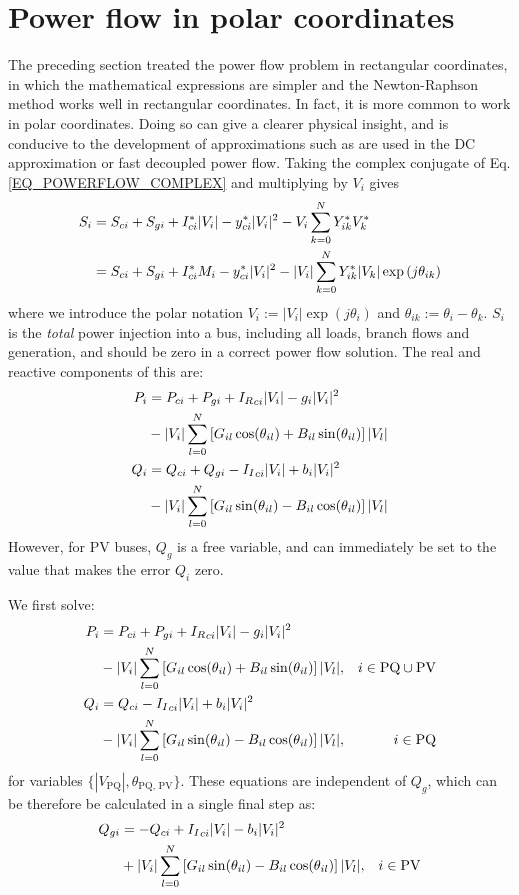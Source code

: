 \documentclass[11pt]{article}
\newcommand{\Ir}{{I_R}}
\newcommand{\Ii}{{I_I}}
\begin{document}
\section{Power flow in polar coordinates}
The preceding section treated the power flow problem in rectangular coordinates, in which the mathematical expressions are simpler and the Newton-Raphson method works well in rectangular coordinates. In fact, it is more common to work in polar coordinates. Doing so can give a clearer physical insight, and is conducive to the development of approximations such as are used in the DC approximation or fast decoupled power flow. Taking the complex conjugate of Eq. \ref{EQ_POWERFLOW_COMPLEX} and multiplying by $V_i$ gives
\newcommand{\M}[1]{\ensuremath{|V_{#1}|}}
\newcommand{\cs}[1]{\ensuremath{\cos(\theta_{#1})}}
\newcommand{\sn}[1]{\ensuremath{\sin(\theta_{#1})}}
\begin{align}
	S_i &= S_{ci} + S_{gi} + I^*_{ci}\M{i} - y^*_{ci}\M{i}^2 - V_i\sum_{k = 0}^N{Y^*_{ik}V^*_k} \notag \\
	&= S_{ci} + S_{gi} + I^*_{ci}M_i - y^*_{ci}\M{i}^2 - \M{i}\sum_{k = 0}^N{Y^*_{ik}\M{k}\exp{(j\theta_{ik})}}
\end{align}
where we introduce the polar notation $V_i := \M{i} \exp{(j\theta_i)}$ and $\theta_{ik} := \theta_i - \theta_k$. $S_i$ is the \emph{total} power injection into a bus, including all loads, branch flows and generation, and should be zero in a correct power flow solution. The real and reactive components of this are:
\begin{align}
	P_i &= P_{ci} + P_{gi} + \Ir_{ci}\M{i} - g_i\M{i}^2 \notag \\
	&- \M{i}\sum_{l = 0}^N{\left[G_{il}\cs{il} + B_{il}\sn{il}\right]\M{l}} \notag \\
	Q_i &= Q_{ci} + Q_{gi} - \Ii_{ci}\M{i} + b_i\M{i}^2 \notag \\
	&- \M{i}\sum_{l = 0}^N{\left[G_{il}\sn{il} - B_{il}\cs{il}\right]\M{l}} \notag \\
\end{align}
However, for PV buses, $Q_{g}$ is a free variable, and can immediately be set to the value that makes the error $Q_i$ zero.

We first solve:
\begin{align}
	P_i &= P_{ci} + P_{gi} + \Ir_{ci}\M{i} - g_i\M{i}^2 \notag \\
	&- \M{i}\sum_{l = 0}^N{\left[G_{il}\cs{il} + B_{il}\sn{il}\right]\M{l}}  , & i \in \mathrm{PQ} \cup \mathrm{PV}\notag \\
	Q_i &= Q_{ci} - \Ii_{ci}\M{i} + b_i\M{i}^2 \notag \\
	&- \M{i}\sum_{l = 0}^N{\left[G_{il}\sn{il} - B_{il}\cs{il}\right]\M{l}}, & i \in \mathrm{PQ}
\end{align}
for variables $\{\M{\text{PQ}}, \theta_\text{PQ, PV}\}$. These equations are independent of $Q_g$, which can be therefore be calculated in a single final step as:
\begin{align}
	Q_{gi} &= -Q_{ci} + \Ii_{ci}\M{i} - b_i\M{i}^2 \notag \\
	&+ \M{i}\sum_{l = 0}^N{\left[G_{il}\sn{il} - B_{il}\cs{il}\right]\M{l}}, & i \in \mathrm{PV}
\end{align}
\end{document}
